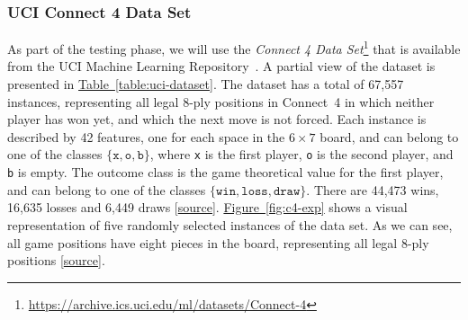 \documentclass{article}
\newcommand{\GithubURL}[1]{[\href{https://github.com/davidrobles/mlnd-capstone-code/blob/master/#1}{source}]}
\newcommand{\URLUCI}{\url{https://archive.ics.uci.edu/ml/datasets/Connect-4}}
\begin{document}
\subsubsection{UCI Connect 4 Data Set}
\label{sec:uci-c4}

As part of the testing phase, we will use the \emph{Connect 4 Data Set}\footnote{\URLUCI{}} that is
available from the UCI Machine Learning Repository~\citep{Hettich1998UCI}. A partial view of the
dataset is presented in \hyperref[table:uci-dataset]{Table~\ref*{table:uci-dataset}}. The dataset
has a total of 67,557 instances, representing all legal 8-ply positions in \mbox{Connect 4} in which
neither player has won yet, and which the next move is not forced. Each instance is described by 42
features, one for each space in the $6 \times 7$ board, and can belong to one of the classes
$\{\texttt{x}, \texttt{o}, \texttt{b}\}$, where \texttt{x} is the first player, \texttt{o} is the
second player, and \texttt{b} is empty. The outcome class is the game theoretical value for the
first player, and can belong to one of the classes $\{\texttt{win}, \texttt{loss}, \texttt{draw}\}$.
There are 44,473 wins, 16,635 losses and 6,449 draws \GithubURL{experiments/c4_uci_data_expl.py}.
\hyperref[fig:c4-exp]{Figure~\ref*{fig:c4-exp}} shows a visual representation of five randomly
selected instances of the data set. As we can see, all game positions have eight pieces in the
board, representing all legal 8-ply positions \GithubURL{experiments/c4_uci_viz.py}.

\end{document}
